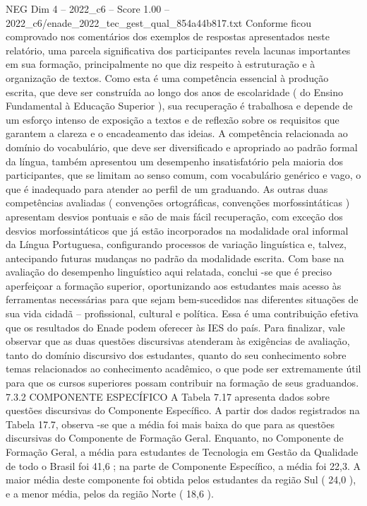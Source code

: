 \begin{textsample}{NEG Dim 4 – 2022\_c6 – Score 1.00 – 2022\_c6/enade\_2022\_tec\_gest\_qual\_854a44b817.txt}
Conforme ficou comprovado nos comentários dos exemplos de respostas apresentados neste relatório, uma parcela significativa dos participantes revela lacunas importantes em sua formação, principalmente no que diz respeito à estruturação e à organização de textos.
Como esta é uma competência essencial à produção escrita, que deve ser construída ao longo dos anos de escolaridade ( do Ensino Fundamental à Educação Superior ), sua recuperação é trabalhosa e depende de um esforço intenso de exposição a textos e de reflexão sobre os requisitos que garantem a clareza e o encadeamento das ideias.
A competência relacionada ao domínio do vocabulário, que deve ser diversificado e apropriado ao padrão formal da língua, também apresentou um desempenho insatisfatório pela maioria dos participantes, que se limitam ao senso comum, com vocabulário genérico e vago, o que é inadequado para atender ao perfil de um graduando.
As outras duas competências avaliadas ( convenções ortográficas, convenções morfossintáticas ) apresentam desvios pontuais e são de mais fácil recuperação, com exceção dos desvios morfossintáticos que já estão incorporados na modalidade oral informal da Língua Portuguesa, configurando processos de variação linguística e, talvez, antecipando futuras mudanças no padrão da modalidade escrita.
Com base na avaliação do desempenho linguístico aqui relatada, conclui -se que é preciso aperfeiçoar a formação superior, oportunizando aos estudantes mais acesso às ferramentas necessárias para que sejam bem-sucedidos nas diferentes situações de sua vida cidadã – profissional, cultural e política.
Essa é uma contribuição efetiva que os resultados do Enade podem oferecer às IES do país.
Para finalizar, vale observar que as duas questões discursivas atenderam às exigências de avaliação, tanto do domínio discursivo dos estudantes, quanto do seu conhecimento sobre temas relacionados ao conhecimento acadêmico, o que pode ser extremamente útil para que os cursos superiores possam contribuir na formação de seus graduandos. 7.3.2 COMPONENTE ESPECÍFICO A Tabela 7.17 apresenta dados sobre questões discursivas do Componente Específico.
A partir dos dados registrados na Tabela 17.7, observa -se que a média foi mais baixa do que para as questões discursivas do Componente de Formação Geral.
Enquanto, no Componente de Formação Geral, a média para estudantes de Tecnologia em Gestão da Qualidade de todo o Brasil foi 41,6 ; na parte de Componente Específico, a média foi 22,3.
A maior média deste componente foi obtida pelos estudantes da região Sul ( 24,0 ), e a menor média, pelos da região Norte ( 18,6 ).

\end{textsample}
